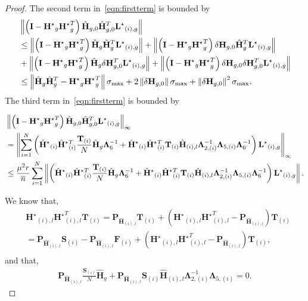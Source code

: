 \documentclass[twoside,11pt]{article}
\newcommand{\norm}[1]{\left\lVert#1\right\rVert}
\newcommand{\matF}{\mathbf{F}}
\newcommand{\hmatHst}{{\hat{\mathbf{H}}}^{\star}{}}
\newcommand{\hmatH}{{\hat{\mathbf{H}}}{}}
\newcommand{\matHst}{{\mathbf{H}^\star}}
\newcommand{\matI}{\mathbf{I}}
\newcommand{\matLst}{{\mathbf{L}^\star}}
\newcommand{\matP}{\mathbf{P}}
\newcommand{\matT}{\mathbf{T}}
\newcommand{\matLambda}{\mathbf{\Lambda}}
\newcommand{\matS}{\mathbf{S}}
\newcommand{\dtmatH}{\delta\mathbf{H}}
\newcommand{\gop}{\sigma_{\max}}
\newcommand{\murnb}{\frac{\mu^2 r}{\overline{n}}}
\begin{document}
\begin{proof}
The second term in~\eqref{eqn:firstterm} is bounded by
\begin{align*}
&\norm{\left(\matI-\matHst_{g}\matHst_{g}^T\right)\hmatH_{g,0}\hmatH_{g,0}^T\matLst_{(i),g}}\notag\\
&\le \norm{\left(\matI-\matHst_{g}\matHst_{g}^T\right)\hmatH_{g}\hmatH_{g}^T\matLst_{(i),g}}+\norm{\left(\matI-\matHst_{g}\matHst_{g}^T\right)\dtmatH_{g,0}\hmatH_{g}^T\matLst_{(i),g}}\\
&+\norm{\left(\matI-\matHst_{g}\matHst_{g}^T\right)\hmatH_{g}\dtmatH_{g,0}^T\matLst_{(i),g}}+\norm{\left(\matI-\matHst_{g}\matHst_{g}^T\right)\dtmatH_{g,0}\dtmatH_{g,0}^T\matLst_{(i),g}}\\
&\le \norm{\hmatH_{g}\hmatH_{g}^T-\matHst_{g}\matHst_{g}^T}\gop+2\norm{\dtmatH_{g,0}}\gop+\norm{\dtmatH_{g,0}}^2\gop .
\end{align*}
The third term in~\eqref{eqn:firstterm} is bounded by

\begin{align}
&\norm{\left(\matI-\matHst_{g}\matHst_{g}^T\right)\hmatH_{g,0}\hmatH_{g,0}^T\matLst_{(i),g}}_{\infty}\notag\\
&=\norm{\sum_{i=1}^N
\left(\hmatHst_{(i)}\hmatHst_{(i)}^T\frac{\matT_{(i)}}{N}\hmatH_g\matLambda_6^{-1}+
\hmatHst_{(i)}\hmatHst_{(i)}^T\matT_{(i)}\hmatH_{(i),l}\matLambda_{2,(i)}^{-1}\matLambda_{5,(i)}\matLambda_6^{-1}\right)\matLst_{(i),g}}_{\infty}\notag\\
&\le \murnb\sum_{i=1}^N\norm{
\left(\hmatHst_{(i)}\hmatHst_{(i)}^T\frac{\matT_{(i)}}{N}\hmatH_g\matLambda_6^{-1}+
\hmatHst_{(i)}\hmatHst_{(i)}^T\matT_{(i)}\hmatH_{(i),l}\matLambda_{2,(i)}^{-1}\matLambda_{5,(i)}\matLambda_6^{-1}\right)\matLst_{(i),g}}.\notag\\
\end{align} 

We know that,
\begin{align*}
&\matHst_{(i),l}\matHst_{(i),l}^T\matT_{(i)}=\matP_{\hmatH_{(i),l}}\matT_{(i)}+\left(\matHst_{(i),l}\matHst_{(i),l}^T-\matP_{\hmatH_{(i),l}}\right)\matT_{(i)}\\
&=\matP_{\hmatH_{(i),l}}\matS_{(i)} - \matP_{\hmatH_{(i),l}}\matF_{(i)}+\left(\matHst_{(i),l}\matHst_{(i),l}^T-\matP_{\hmatH_{(i),l}}\right)\matT_{(i)},\\
\end{align*}
and that,
\begin{align*}
\matP_{\hmatH_{(i),l}}\frac{\matS_{(i)}}{N}\hmatH_g+\matP_{\hmatH_{(i),l}}\matS_{(i)}\hmatH_{(i),l}\matLambda_{2,(i)}^{-1}\matLambda_{5,(i)}=0.
\end{align*}


\end{proof}
\end{document}
